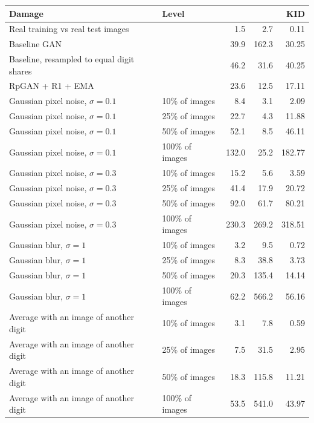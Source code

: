 \begin{table}[H]
\centering
\footnotesize
\setlength{\tabcolsep}{4pt}
\begin{tabular}{llrrr}
\toprule
Damage & Level & \finc{} & \fcnn{} & KID \\
\midrule
Real training vs real test images &  & 1.5 & 2.7 & 0.11 \\
\midrule
Baseline GAN &  & 39.9 & 162.3 & 30.25 \\
Baseline, resampled to equal digit shares &  & 46.2 & 31.6 & 40.25 \\
RpGAN + R1 + EMA &  & 23.6 & 12.5 & 17.11 \\
\midrule
Gaussian pixel noise, $\sigma=0.1$ & 10\% of images & 8.4 & 3.1 & 2.09 \\
Gaussian pixel noise, $\sigma=0.1$ & 25\% of images & 22.7 & 4.3 & 11.88 \\
Gaussian pixel noise, $\sigma=0.1$ & 50\% of images & 52.1 & 8.5 & 46.11 \\
Gaussian pixel noise, $\sigma=0.1$ & 100\% of images & 132.0 & 25.2 & 182.77 \\
\midrule
Gaussian pixel noise, $\sigma=0.3$ & 10\% of images & 15.2 & 5.6 & 3.59 \\
Gaussian pixel noise, $\sigma=0.3$ & 25\% of images & 41.4 & 17.9 & 20.72 \\
Gaussian pixel noise, $\sigma=0.3$ & 50\% of images & 92.0 & 61.7 & 80.21 \\
Gaussian pixel noise, $\sigma=0.3$ & 100\% of images & 230.3 & 269.2 & 318.51 \\
\midrule
Gaussian blur, $\sigma=1$ & 10\% of images & 3.2 & 9.5 & 0.72 \\
Gaussian blur, $\sigma=1$ & 25\% of images & 8.3 & 38.8 & 3.73 \\
Gaussian blur, $\sigma=1$ & 50\% of images & 20.3 & 135.4 & 14.14 \\
Gaussian blur, $\sigma=1$ & 100\% of images & 62.2 & 566.2 & 56.16 \\
\midrule
Average with an image of another digit & 10\% of images & 3.1 & 7.8 & 0.59 \\
Average with an image of another digit & 25\% of images & 7.5 & 31.5 & 2.95 \\
Average with an image of another digit & 50\% of images & 18.3 & 115.8 & 11.21 \\
Average with an image of another digit & 100\% of images & 53.5 & 541.0 & 43.97 \\

\end{tabular}
\end{table}
